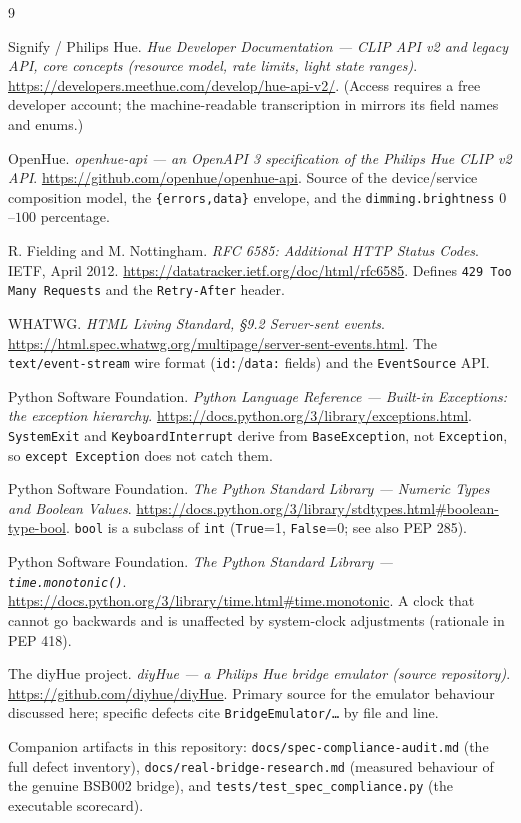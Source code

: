 \documentclass[11pt,a4paper]{article}
\begin{document}
\begin{thebibliography}{9}

 Signify / Philips Hue. \emph{Hue Developer Documentation --- CLIP
API v2 and legacy API, core concepts (resource model, rate limits, light state
ranges)}. \url{https://developers.meethue.com/develop/hue-api-v2/}. (Access
requires a free developer account; the machine-readable transcription in
\cite{openhue} mirrors its field names and enums.)

 OpenHue. \emph{openhue-api --- an OpenAPI 3 specification of the
Philips Hue CLIP v2 API}. \url{https://github.com/openhue/openhue-api}. Source of
the device/service composition model, the \texttt{\{errors,data\}} envelope, and
the \texttt{dimming.brightness} $0$--$100$ percentage.

 R. Fielding and M. Nottingham. \emph{RFC 6585: Additional HTTP
Status Codes}. IETF, April 2012. \url{https://datatracker.ietf.org/doc/html/rfc6585}.
Defines \texttt{429 Too Many Requests} and the \texttt{Retry-After} header.

 WHATWG. \emph{HTML Living Standard, \S9.2 Server-sent events}.
\url{https://html.spec.whatwg.org/multipage/server-sent-events.html}. The
\texttt{text/event-stream} wire format (\texttt{id:}/\texttt{data:} fields) and
the \texttt{EventSource} API.

 Python Software Foundation. \emph{Python Language Reference ---
Built-in Exceptions: the exception hierarchy}.
\url{https://docs.python.org/3/library/exceptions.html}. \texttt{SystemExit} and
\texttt{KeyboardInterrupt} derive from \texttt{BaseException}, not
\texttt{Exception}, so \texttt{except Exception} does not catch them.

 Python Software Foundation. \emph{The Python Standard Library
--- Numeric Types and Boolean Values}.
\url{https://docs.python.org/3/library/stdtypes.html\#boolean-type-bool}.
\texttt{bool} is a subclass of \texttt{int} (\texttt{True}=1, \texttt{False}=0;
see also PEP 285).

 Python Software Foundation. \emph{The Python Standard Library ---
\texttt{time.monotonic()}}. \url{https://docs.python.org/3/library/time.html\#time.monotonic}.
A clock that cannot go backwards and is unaffected by system-clock adjustments
(rationale in PEP 418).

 The diyHue project. \emph{diyHue --- a Philips Hue bridge
emulator (source repository)}. \url{https://github.com/diyhue/diyHue}. Primary
source for the emulator behaviour discussed here; specific defects cite
\texttt{BridgeEmulator/\ldots} by file and line.

 Companion artifacts in this repository:
\texttt{docs/spec-compliance-audit.md} (the full defect inventory),
\texttt{docs/real-bridge-research.md} (measured behaviour of the genuine BSB002
bridge), and \texttt{tests/test\_spec\_compliance.py} (the executable scorecard).

\end{thebibliography}
\end{document}
